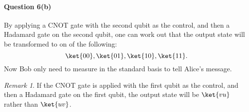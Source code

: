 \documentclass[12pt,answers]{exam}
\theoremstyle{remark}
\newtheorem*{remark}{Remark}
\begin{document}
\paragraph{Question 6(b)} By applying a CNOT gate with the second qubit as the control, and then a Hadamard gate on the second qubit, one can work out that the output state will be transformed to on of the following:
\[
  \ket{00}, \ket{01}, \ket{10}, \ket{11}.
\]
Now Bob only need to measure in the standard basis to tell Alice's message.

\begin{remark}
    If the CNOT gate is applied with the first qubit as the control, and then a Hadamard gate on the first qubit, the output state will be $\ket{vu}$ rather than $\ket{uv}$.
\end{remark}
\end{document}
